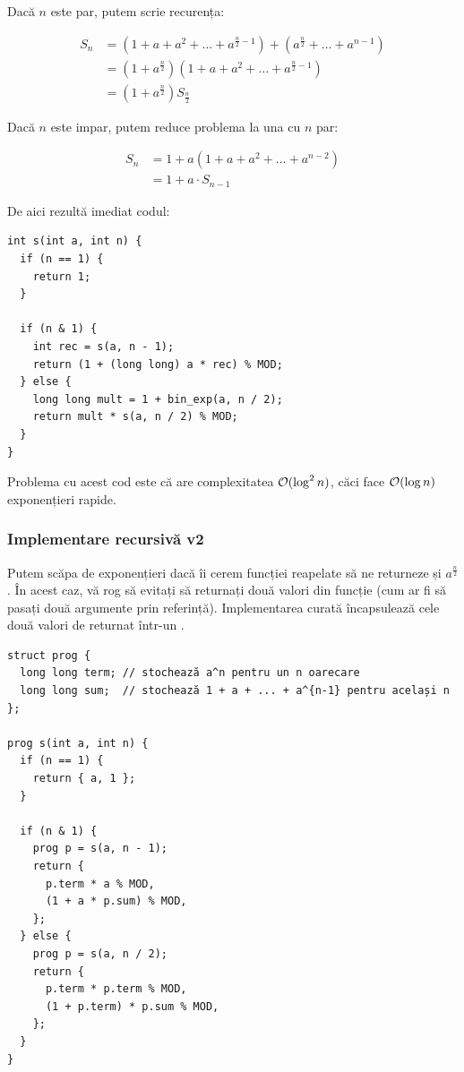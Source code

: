 \documentclass[../main.tex]{subfiles}
\begin{document}
Dacă $n$ este par, putem scrie recurența:

\begin{align*}
S_n &= (1 + a + a^2 + \dots + a^{\frac{n}{2}-1}) + (a^\frac{n}{2} + \dots + a^{n-1}) \\
&= (1 + a^\frac{n}{2}) (1 + a + a^2 + \dots + a^{\frac{n}{2}-1}) \\
&= (1 + a^\frac{n}{2}) S_{\frac{n}{2}}
\end{align*}

Dacă $n$ este impar, putem reduce problema la una cu $n$ par:

\begin{align*}
S_n &= 1 + a(1 + a + a^2 + \dots + a^{n-2}) \\
&= 1 + a \cdot S_{n-1}
\end{align*}

De aici rezultă imediat codul:

\begin{verbatim}
int s(int a, int n) {
  if (n == 1) {
    return 1;
  }

  if (n & 1) {
    int rec = s(a, n - 1);
    return (1 + (long long) a * rec) % MOD;
  } else {
    long long mult = 1 + bin_exp(a, n / 2);
    return mult * s(a, n / 2) % MOD;
  }
}
\end{verbatim}

Problema cu acest cod este că are complexitatea $\mathcal{O}(\log^2 n)$, căci face $\mathcal{O}(\log n)$ exponențieri rapide.

\subsubsection*{Implementare recursivă v2}

Putem scăpa de exponențieri dacă îi cerem funcției reapelate să ne returneze și $a^{\frac{n}{2}}$. În acest caz, vă rog să evitați să returnați două valori din funcție (cum ar fi să pasați două argumente prin referință). Implementarea curată încapsulează cele două valori de returnat într-un .

\begin{verbatim}
struct prog {
  long long term; // stochează a^n pentru un n oarecare
  long long sum;  // stochează 1 + a + ... + a^{n-1} pentru același n
};

prog s(int a, int n) {
  if (n == 1) {
    return { a, 1 };
  }

  if (n & 1) {
    prog p = s(a, n - 1);
    return {
      p.term * a % MOD,
      (1 + a * p.sum) % MOD,
    };
  } else {
    prog p = s(a, n / 2);
    return {
      p.term * p.term % MOD,
      (1 + p.term) * p.sum % MOD,
    };
  }
}
\end{verbatim}
\end{document}
